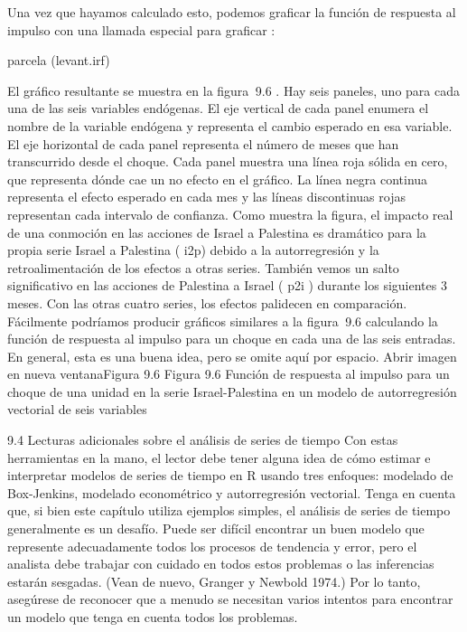 \documentclass[
]{book}
\begin{document}
Una vez que hayamos calculado esto, podemos graficar la función de respuesta al impulso con una llamada especial para graficar :

parcela (levant.irf)

El gráfico resultante se muestra en la figura  9.6 . Hay seis paneles, uno para cada una de las seis variables endógenas. El eje vertical de cada panel enumera el nombre de la variable endógena y representa el cambio esperado en esa variable. El eje horizontal de cada panel representa el número de meses que han transcurrido desde el choque. Cada panel muestra una línea roja sólida en cero, que representa dónde cae un no efecto en el gráfico. La línea negra continua representa el efecto esperado en cada mes y las líneas discontinuas rojas representan cada intervalo de confianza. Como muestra la figura, el impacto real de una conmoción en las acciones de Israel a Palestina es dramático para la propia serie Israel a Palestina ( i2p) debido a la autorregresión y la retroalimentación de los efectos a otras series. También vemos un salto significativo en las acciones de Palestina a Israel ( p2i ) durante los siguientes 3 meses. Con las otras cuatro series, los efectos palidecen en comparación. Fácilmente podríamos producir gráficos similares a la figura  9.6 calculando la función de respuesta al impulso para un choque en cada una de las seis entradas. En general, esta es una buena idea, pero se omite aquí por espacio.
Abrir imagen en nueva ventanaFigura 9.6
Figura 9.6
Función de respuesta al impulso para un choque de una unidad en la serie Israel-Palestina en un modelo de autorregresión vectorial de seis variables

9.4 Lecturas adicionales sobre el análisis de series de tiempo
Con estas herramientas en la mano, el lector debe tener alguna idea de cómo estimar e interpretar modelos de series de tiempo en R usando tres enfoques: modelado de Box-Jenkins, modelado econométrico y autorregresión vectorial. Tenga en cuenta que, si bien este capítulo utiliza ejemplos simples, el análisis de series de tiempo generalmente es un desafío. Puede ser difícil encontrar un buen modelo que represente adecuadamente todos los procesos de tendencia y error, pero el analista debe trabajar con cuidado en todos estos problemas o las inferencias estarán sesgadas. (Vean de nuevo, Granger y Newbold 1974.) Por lo tanto, asegúrese de reconocer que a menudo se necesitan varios intentos para encontrar un modelo que tenga en cuenta todos los problemas.
\end{document}

